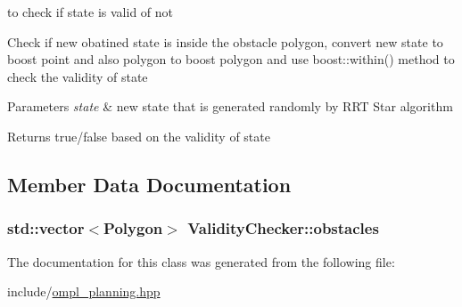 to check if state is valid of not 

Check if new obatined state is inside the obstacle polygon, convert new state to boost point and also polygon to boost polygon and use boost\+::within() method to check the validity of state 
\begin{DoxyParams}{Parameters}
{\em state} & new state that is generated randomly by R\+RT Star algorithm \\
\hline
\end{DoxyParams}
\begin{DoxyReturn}{Returns}
true/false based on the validity of state 
\end{DoxyReturn}


\subsection{Member Data Documentation}
\subsubsection[{\texorpdfstring{obstacles}{obstacles}}]{\setlength{\rightskip}{0pt plus 5cm}std\+::vector$<${\bf Polygon}$>$ Validity\+Checker\+::obstacles}\hypertarget{classValidityChecker_a3680b7a8c6e1d6dbaf7833df9f86ce84}{}\label{classValidityChecker_a3680b7a8c6e1d6dbaf7833df9f86ce84}


The documentation for this class was generated from the following file\+:\begin{DoxyCompactItemize}
\item 
include/\hyperlink{ompl__planning_8hpp}{ompl\+\_\+planning.\+hpp}\end{DoxyCompactItemize}
